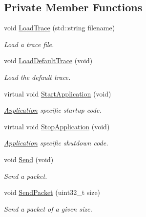 \subsection*{Private Member Functions}
\begin{DoxyCompactItemize}
\item 
void \hyperlink{structns3_1_1UdpTraceClient_a36014292a9c0214c0d8c63ed5dd056ac}{Load\+Trace} (std\+::string filename)
\begin{DoxyCompactList}\small\item\em Load a trace file. \end{DoxyCompactList}\item 
void \hyperlink{structns3_1_1UdpTraceClient_af287f70f63f555dffecd77a0a60caf5f}{Load\+Default\+Trace} (void)
\begin{DoxyCompactList}\small\item\em Load the default trace. \end{DoxyCompactList}\item 
virtual void \hyperlink{structns3_1_1UdpTraceClient_a7d28a5a8886372fc6b10d5fe9deca035}{Start\+Application} (void)
\begin{DoxyCompactList}\small\item\em \hyperlink{classns3_1_1Application}{Application} specific startup code. \end{DoxyCompactList}\item 
virtual void \hyperlink{structns3_1_1UdpTraceClient_a29693203c27eb211932a0955934bfe7f}{Stop\+Application} (void)
\begin{DoxyCompactList}\small\item\em \hyperlink{classns3_1_1Application}{Application} specific shutdown code. \end{DoxyCompactList}\item 
void \hyperlink{structns3_1_1UdpTraceClient_a050aa4d5fea933c1093099846259f6ce}{Send} (void)
\begin{DoxyCompactList}\small\item\em Send a packet. \end{DoxyCompactList}\item 
void \hyperlink{structns3_1_1UdpTraceClient_a7dfbf9354c464bfe8fe303f520c0b83c}{Send\+Packet} (uint32\+\_\+t size)
\begin{DoxyCompactList}\small\item\em Send a packet of a given size. \end{DoxyCompactList}\end{DoxyCompactItemize}
